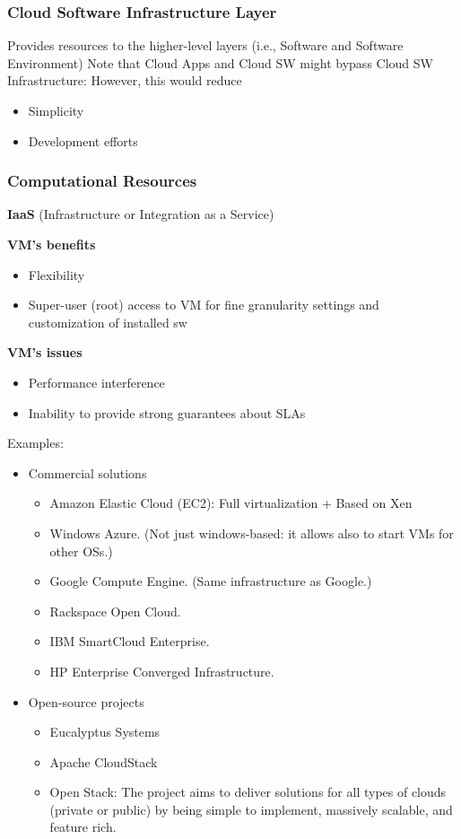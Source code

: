 \documentclass[10pt, oneside]{article}
\begin{document}
\subsubsection{Cloud Software Infrastructure Layer}
Provides resources to the higher-level layers (i.e., Software and Software Environment)
Note that Cloud Apps and Cloud SW might bypass Cloud SW Infrastructure: However, this would reduce\begin{itemize}
    \item Simplicity
    \item Development efforts
\end{itemize} 
\subsubsection*{Computational Resources}
{\bf IaaS} (Infrastructure or Integration as a Service)
\begin{multicols}{2}
    {\bf VM's benefits}\begin{itemize}
        \item Flexibility
        \item Super-user (root) access to VM for fine granularity settings and customization of installed sw
    \end{itemize}
    \columnbreak
    {\bf VM's issues}\begin{itemize}
        \item Performance interference
        \item Inability to provide strong guarantees about SLAs
    \end{itemize}
\end{multicols}
Examples:\begin{itemize}
    \item Commercial solutions\begin{itemize}
        \item Amazon Elastic Cloud (EC2): Full virtualization + Based on Xen 
        \item Windows Azure. (Not just windows-based: it allows also to start VMs for other OSs.)  
        \item Google Compute Engine. (Same infrastructure as Google.)
        \item Rackspace Open Cloud.
        \item IBM SmartCloud Enterprise.
        \item HP Enterprise Converged Infrastructure.
    \end{itemize}
    \item Open-source projects\begin{itemize}
        \item Eucalyptus Systems  \item Apache CloudStack 
        \item Open Stack: The project aims to deliver solutions for all types of clouds (private or public) by being simple to implement, massively scalable, and feature rich.
    \end{itemize}
\end{itemize}
\end{document}
